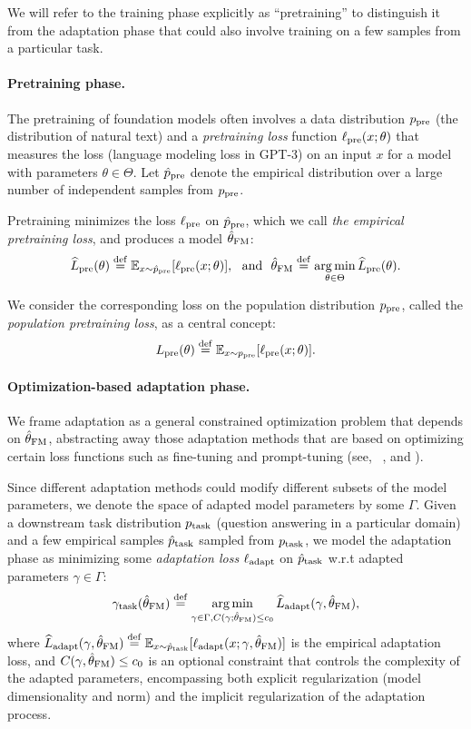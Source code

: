 We will refer to the training phase explicitly as ``pretraining'' to distinguish it from the adaptation phase that could also involve training on a few samples from a particular task. 

\paragraph{Pretraining phase.} 
The pretraining of foundation models often involves a data distribution $p_{\text{pre}}$ (\eg the distribution of natural text) and a \emph{pretraining loss} function $\ell_{\text{pre}}(x;\theta)$ that measures the loss (\eg language modeling loss in GPT-3) on an input $x$ for a model with parameters $\theta\in \Theta$. Let $\hat{p}_{\text{pre}}$ denote the empirical distribution over a large number of independent samples from $p_{\text{pre}}$. 

Pretraining minimizes the loss $\ell_{\text{pre}}$ on $\hat{p}_{\text{pre}}$, which we call \textit{the empirical pretraining loss}, and produces a model $\hat{\theta}_{\textup{FM}}$:
\begin{align}
    \widehat{L}_{\text{pre}}(\theta) \stackrel{\rm def}{=} \mathbb{E}_{x\sim \hat{p}_{\text{pre}}}[\ell_{\text{pre}}(x;\theta)],
        ~~\text{and}~~
\hat{\theta}_{\textup{FM}} \stackrel{\rm def}{=} \operatorname*{arg\,min} \limits_{\theta \in \Theta} \widehat{L}_{\text{pre}}(\theta).
\end{align}

We consider the corresponding loss on the population distribution $p_{\text{pre}}$, called the \textit{population pretraining loss}, as a central concept: 
\begin{align}
   L_{\text{pre}}(\theta) \stackrel{\rm def}{=} \mathbb{E}_{x\sim p_{\text{pre}}}[ \ell_{\text{pre}}(x; \theta)] .
\end{align}

\paragraph{Optimization-based adaptation phase.} 
We frame adaptation as a general constrained optimization problem that depends on $\hat{\theta}_{\textup{FM}}{}$, abstracting away those adaptation methods that are based on optimizing certain loss functions such as fine-tuning and prompt-tuning (see, \eg ~\citep{houlsby19adapter,li2021prefix,lester2021power}, and ).

Since different adaptation methods could modify different subsets of the model parameters, we denote the space of adapted model parameters by some $\Gamma$. Given a downstream task distribution $p_{\text{task}}$ (\eg question answering in a particular domain) and a few empirical samples $\hat{p}_{\text{task}}$ sampled from $p_{\text{task}}$, we model the adaptation phase as minimizing some \textit{adaptation loss} $\ell_{\text{adapt}}$ on $\hat{p}_{\text{task}}$ w.r.t adapted parameters $\gamma \in \Gamma$: 
\begin{align}
\gamma_{\text{task}}(\hat{\theta}_{\textup{FM}}) \stackrel{\rm def}{=} \operatorname*{arg\,min} \limits_{\gamma \in \Gamma, C(\gamma;\hat{\theta}_{\textup{FM}})\le c_0 }\widehat{L}_{\text{adapt}}(\gamma, \hat{\theta}_{\textup{FM}}),
\end{align}
where $\widehat{L}_{\text{adapt}}(\gamma, \hat{\theta}_{\textup{FM}}) \stackrel{\rm def}{=} \mathbb{E}_{x\sim \hat{p}_{\text{task}}}[\ell_{\text{adapt}}(x;\gamma, \hat{\theta}_{\textup{FM}})]$ is the empirical adaptation loss, and $C(\gamma, \hat{\theta}_{\textup{FM}})\leq c_0$ is an optional constraint that controls the complexity of the adapted parameters, encompassing both explicit regularization (\eg model dimensionality and norm) and the implicit regularization of the adaptation process. 

